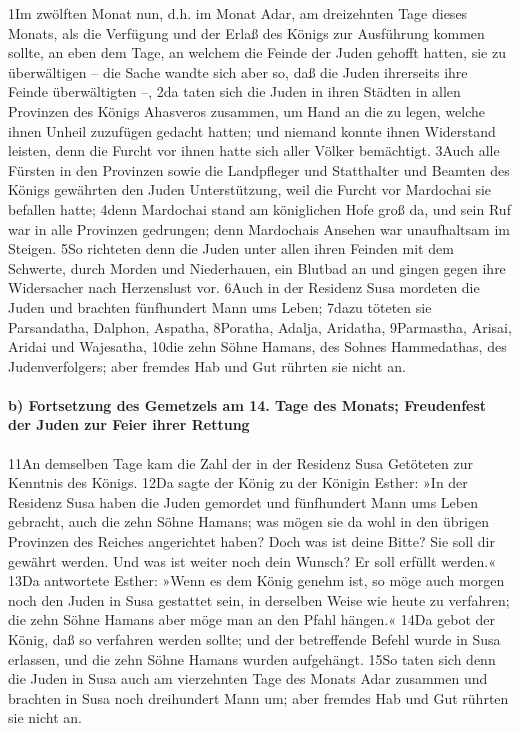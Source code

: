 1Im zwölften Monat nun, d.h. im Monat Adar, am dreizehnten Tage dieses
Monats, als die Verfügung und der Erlaß des Königs zur Ausführung kommen
sollte, an eben dem Tage, an welchem die Feinde der Juden gehofft
hatten, sie zu überwältigen -- die Sache wandte sich aber so, daß die
Juden ihrerseits ihre Feinde überwältigten --, 2da taten sich die Juden
in ihren Städten in allen Provinzen des Königs Ahasveros zusammen, um
Hand an die zu legen, welche ihnen Unheil zuzufügen gedacht hatten; und
niemand konnte ihnen Widerstand leisten, denn die Furcht vor ihnen hatte
sich aller Völker bemächtigt. 3Auch alle Fürsten in den Provinzen sowie
die Landpfleger und Statthalter und Beamten des Königs gewährten den
Juden Unterstützung, weil die Furcht vor Mardochai sie befallen hatte;
4denn Mardochai stand am königlichen Hofe groß da, und sein Ruf war in
alle Provinzen gedrungen; denn Mardochais Ansehen war unaufhaltsam im
Steigen. 5So richteten denn die Juden unter allen ihren Feinden mit dem
Schwerte, durch Morden und Niederhauen, ein Blutbad an und gingen gegen
ihre Widersacher nach Herzenslust vor. 6Auch in der Residenz Susa
mordeten die Juden und brachten fünfhundert Mann ums Leben; 7dazu
töteten sie Parsandatha, Dalphon, Aspatha, 8Poratha, Adalja, Aridatha,
9Parmastha, Arisai, Aridai und Wajesatha, 10die zehn Söhne Hamans, des
Sohnes Hammedathas, des Judenverfolgers; aber fremdes Hab und Gut
rührten sie nicht an.

\hypertarget{b-fortsetzung-des-gemetzels-am-14.-tage-des-monats-freudenfest-der-juden-zur-feier-ihrer-rettung}{%
\paragraph{b) Fortsetzung des Gemetzels am 14. Tage des Monats;
Freudenfest der Juden zur Feier ihrer
Rettung}\label{b-fortsetzung-des-gemetzels-am-14.-tage-des-monats-freudenfest-der-juden-zur-feier-ihrer-rettung}}

11An demselben Tage kam die Zahl der in der Residenz Susa Getöteten zur
Kenntnis des Königs. 12Da sagte der König zu der Königin Esther: »In der
Residenz Susa haben die Juden gemordet und fünfhundert Mann ums Leben
gebracht, auch die zehn Söhne Hamans; was mögen sie da wohl in den
übrigen Provinzen des Reiches angerichtet haben? Doch was ist deine
Bitte? Sie soll dir gewährt werden. Und was ist weiter noch dein Wunsch?
Er soll erfüllt werden.« 13Da antwortete Esther: »Wenn es dem König
genehm ist, so möge auch morgen noch den Juden in Susa gestattet sein,
in derselben Weise wie heute zu verfahren; die zehn Söhne Hamans aber
möge man an den Pfahl hängen.« 14Da gebot der König, daß so verfahren
werden sollte; und der betreffende Befehl wurde in Susa erlassen, und
die zehn Söhne Hamans wurden aufgehängt. 15So taten sich denn die Juden
in Susa auch am vierzehnten Tage des Monats Adar zusammen und brachten
in Susa noch dreihundert Mann um; aber fremdes Hab und Gut rührten sie
nicht an.

